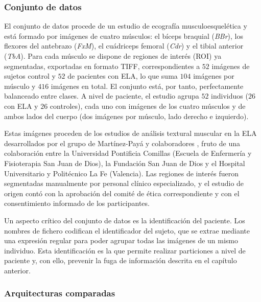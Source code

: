 \documentclass[12pt]{extarticle}
\numberwithin{equation}{section}
\begin{document}
\begin{refsection}
\subsubsection{Conjunto de datos}

El conjunto de datos procede de un estudio de ecografía musculoesquelética y está formado por imágenes de cuatro músculos: el bíceps braquial (\textit{BBr}), los flexores del antebrazo (\textit{FxM}), el cuádriceps femoral (\textit{Cdr}) y el tibial anterior (\textit{TbA}). Para cada músculo se dispone de regiones de interés (ROI) ya segmentadas, exportadas en formato TIFF, correspondientes a $52$ imágenes de sujetos control y $52$ de pacientes con ELA, lo que suma $104$ imágenes por músculo y $416$ imágenes en total. El conjunto está, por tanto, perfectamente balanceado entre clases. A nivel de paciente, el estudio agrupa $52$ individuos ($26$ con ELA y $26$ controles), cada uno con imágenes de los cuatro músculos y de ambos lados del cuerpo (dos imágenes por músculo, lado derecho e izquierdo).

Estas imágenes proceden de los estudios de análisis textural muscular en la ELA desarrollados por el grupo de Martínez-Payá y colaboradores \cite{martinezpaya2017quantitative, martinezpaya2018monitoring}, fruto de una colaboración entre la Universidad Pontificia Comillas (Escuela de Enfermería y Fisioterapia San Juan de Dios), la Fundación San Juan de Dios y el Hospital Universitario y Politécnico La Fe (Valencia). Las regiones de interés fueron segmentadas manualmente por personal clínico especializado, y el estudio de origen contó con la aprobación del comité de ética correspondiente y con el consentimiento informado de los participantes.

Un aspecto crítico del conjunto de datos es la identificación del paciente. Los nombres de fichero codifican el identificador del sujeto, que se extrae mediante una expresión regular para poder agrupar todas las imágenes de un mismo individuo. Esta identificación es la que permite realizar particiones a nivel de paciente y, con ello, prevenir la fuga de información descrita en el capítulo anterior.

\subsubsection{Arquitecturas comparadas}


\end{refsection}
\end{document}
